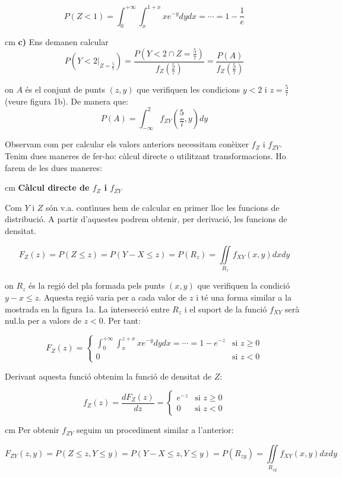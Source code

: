 \documentclass{article}
\begin{document}
\[
P(Z < 1) = \int_0^{+\infty} \int_x^{1+x} x e^{-y} dy dx = \cdots = 1-\frac{1}{e}
\]


 cm
\noindent
\textbf{c)} Ens demanen calcular 
\[
P(Y < 2 |_{Z=\frac{5}{7}})=\frac{ P( Y < 2 \cap Z=\frac{5}{7} )}{f_Z(\frac{5}{7})}=\frac{P(A)}{f_Z(\frac{5}{7})}
\]

on $A$ \'es el conjunt de punts $(z, y)$ que verifiquen les condicions $y < 2$ i $z=\frac{5}{7}$ (veure figura 1b).
De manera que: 
\[
P(A)=\int_{-\infty}^2 f_{ZY}(\frac{5}{7}, y) dy
\]

Observam com per calcular els valors anteriors necessitam con\`eixer $f_Z$ i $f_{ZY}$. Tenim dues maneres de fer-ho:
c\`alcul directe o utilitzant transformacions. Ho farem de les dues maneres:

 cm
\noindent
\textbf{C\`alcul directe de $f_Z$ i $f_{ZY}$}

Com $Y$ i $Z$ s\'on v.a. cont\'\i nues hem de calcular en primer lloc les funcions de distribuci\'o. A partir d'aquestes
podrem obtenir, per derivaci\'o, les funcions de densitat.

\[
F_Z(z)=P(Z \leq z) = P(Y-X \leq z)=P(R_z)=\iint\limits_{R_z} f_{XY}(x, y) dx dy
\]

on $R_z$ \'es la regi\'o del pla formada pels punts $(x, y)$ que verifiquen la condici\'o $y-x \leq z$. Aquesta regi\'o
varia per a cada valor de $z$ i t\'e una forma similar a la mostrada en la figura 1a. La intersecci\'o entre $R_z$ 
i el suport de la funci\'o $f_{XY}$ ser\`a nul.la per a valors de $z < 0$. Per tant:

\[
F_Z(z)=\begin{cases} \int_0^{+\infty} \int_x^{z+x} x e^{-y} dy dx = \cdots = 1-e^{-z} & \text{si } z \geq 0 \\
0 & \text{si } z < 0 \end{cases}
\]

Derivant aquesta funci\'o obtenim la funci\'o de densitat de $Z$:

\[
f_Z(z)=\frac{d F_Z(z)}{dz}=\begin{cases} e^{-z} & \text{si } z \geq 0 \\
0 & \text{si } z < 0 \end{cases}
\]

 cm
Per obtenir $f_{ZY}$ seguim un procediment similar a l'anterior:

\[
F_{ZY}(z, y)=P(Z \leq z, Y \leq y)=P(Y-X \leq z, Y \leq y)=P(R_{zy})=\iint\limits_{R_{zy}} f_{XY}(x, y) dx dy
\]
\end{document}
